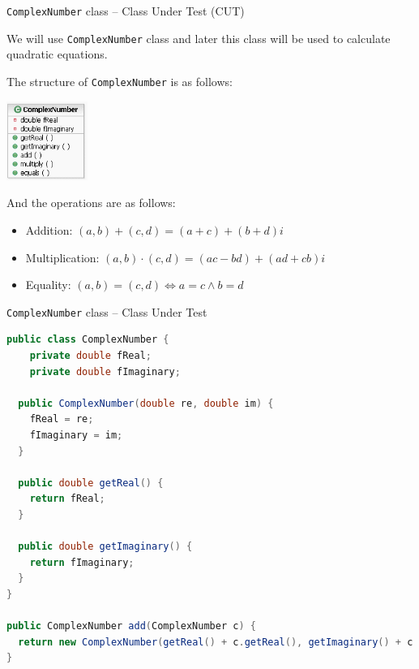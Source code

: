 \documentclass[11pt, xcolor=svgnames]{beamer}
\begin{document}
\begin{frame}[fragile]{\texttt{ComplexNumber} class -- Class Under Test (CUT)}

We will use \texttt{ComplexNumber} class and later this class will be used to calculate quadratic equations.

The structure of \texttt{ComplexNumber} is as follows:

\begin{center}
 \includegraphics[width=75pt]{./figs/ComplexNumber}
\end{center}

And the operations are as follows:

\begin{itemize}
 \item Addition: $(a,b)+(c,d)=(a+c)+(b+d)i$
 \item Multiplication: $(a,b)\cdot(c,d)=(ac-bd) + (ad+cb)i$
 \item Equality: $(a,b)=(c,d) \Leftrightarrow a=c \wedge b=d$
\end{itemize}

\end{frame}




\begin{frame}[fragile]{\texttt{ComplexNumber} class -- Class Under Test}


\begin{lstlisting}[language=Java,basicstyle=\scriptsize]
public class ComplexNumber {
    private double fReal;
    private double fImaginary;

  public ComplexNumber(double re, double im) {
    fReal = re;
    fImaginary = im;
  }

  public double getReal() {
    return fReal;
  }

  public double getImaginary() {
    return fImaginary;
  }
}

public ComplexNumber add(ComplexNumber c) {
  return new ComplexNumber(getReal() + c.getReal(), getImaginary() + c.getImaginary());
}
\end{lstlisting}

\end{frame}
\end{document}

